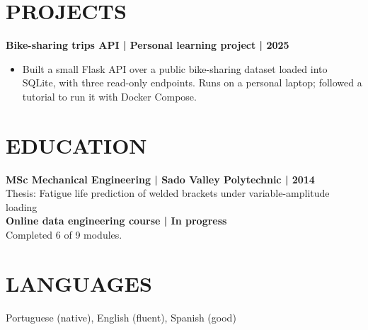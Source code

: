 \documentclass[11pt,a4paper]{article}
\begin{document}
\section*{PROJECTS}
\textbf{Bike-sharing trips API | Personal learning project | 2025}
\begin{itemize}
\item Built a small Flask API over a public bike-sharing dataset loaded into SQLite, with three read-only endpoints. Runs on a personal laptop; followed a tutorial to run it with Docker Compose.
\end{itemize}

\section*{EDUCATION}
\textbf{MSc Mechanical Engineering | Sado Valley Polytechnic | 2014}\\
Thesis: Fatigue life prediction of welded brackets under variable-amplitude loading\\[0.5em]
\textbf{Online data engineering course | In progress}\\
Completed 6 of 9 modules.

\section*{LANGUAGES}
Portuguese (native), English (fluent), Spanish (good)
\end{document}
